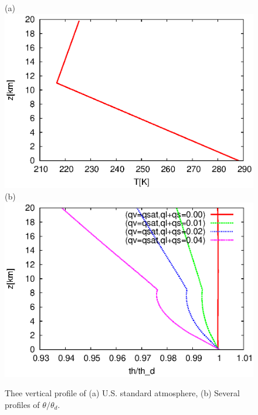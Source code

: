 \begin{figure}[t]
  (a)\\
  \includegraphics{./figure/us_std_atm_profile.eps}\\
  (b)\\
  \includegraphics{./figure/theta_theta_d_profile.eps}\\
  \caption{Thee vertical profile of (a) U.S. standard atmosphere,
  (b) Several profiles of $\theta/\theta_d$.}
  \label{fig:fig1}
\end{figure}
